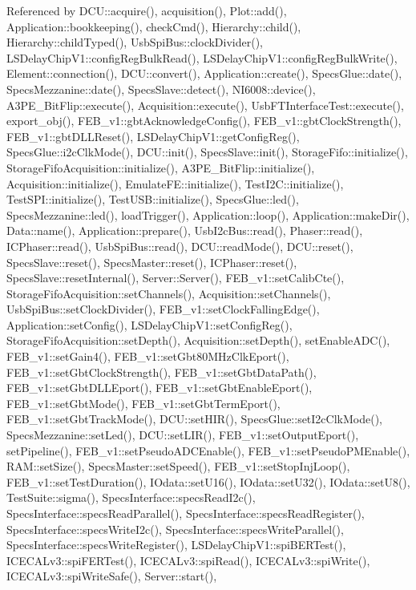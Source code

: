 Referenced by D\+C\+U\+::acquire(), acquisition(), Plot\+::add(), Application\+::bookkeeping(), check\+Cmd(), Hierarchy\+::child(), Hierarchy\+::child\+Typed(), Usb\+Spi\+Bus\+::clock\+Divider(), L\+S\+Delay\+Chip\+V1\+::config\+Reg\+Bulk\+Read(), L\+S\+Delay\+Chip\+V1\+::config\+Reg\+Bulk\+Write(), Element\+::connection(), D\+C\+U\+::convert(), Application\+::create(), Specs\+Glue\+::date(), Specs\+Mezzanine\+::date(), Specs\+Slave\+::detect(), N\+I6008\+::device(), A3\+P\+E\+\_\+\+Bit\+Flip\+::execute(), Acquisition\+::execute(), Usb\+F\+T\+Interface\+Test\+::execute(), export\+\_\+obj(), F\+E\+B\+\_\+v1\+::gbt\+Acknowledge\+Config(), F\+E\+B\+\_\+v1\+::gbt\+Clock\+Strength(), F\+E\+B\+\_\+v1\+::gbt\+D\+L\+L\+Reset(), L\+S\+Delay\+Chip\+V1\+::get\+Config\+Reg(), Specs\+Glue\+::i2c\+Clk\+Mode(), D\+C\+U\+::init(), Specs\+Slave\+::init(), Storage\+Fifo\+::initialize(), Storage\+Fifo\+Acquisition\+::initialize(), A3\+P\+E\+\_\+\+Bit\+Flip\+::initialize(), Acquisition\+::initialize(), Emulate\+F\+E\+::initialize(), Test\+I2\+C\+::initialize(), Test\+S\+P\+I\+::initialize(), Test\+U\+S\+B\+::initialize(), Specs\+Glue\+::led(), Specs\+Mezzanine\+::led(), load\+Trigger(), Application\+::loop(), Application\+::make\+Dir(), Data\+::name(), Application\+::prepare(), Usb\+I2c\+Bus\+::read(), Phaser\+::read(), I\+C\+Phaser\+::read(), Usb\+Spi\+Bus\+::read(), D\+C\+U\+::read\+Mode(), D\+C\+U\+::reset(), Specs\+Slave\+::reset(), Specs\+Master\+::reset(), I\+C\+Phaser\+::reset(), Specs\+Slave\+::reset\+Internal(), Server\+::\+Server(), F\+E\+B\+\_\+v1\+::set\+Calib\+Cte(), Storage\+Fifo\+Acquisition\+::set\+Channels(), Acquisition\+::set\+Channels(), Usb\+Spi\+Bus\+::set\+Clock\+Divider(), F\+E\+B\+\_\+v1\+::set\+Clock\+Falling\+Edge(), Application\+::set\+Config(), L\+S\+Delay\+Chip\+V1\+::set\+Config\+Reg(), Storage\+Fifo\+Acquisition\+::set\+Depth(), Acquisition\+::set\+Depth(), set\+Enable\+A\+D\+C(), F\+E\+B\+\_\+v1\+::set\+Gain4(), F\+E\+B\+\_\+v1\+::set\+Gbt80\+M\+Hz\+Clk\+Eport(), F\+E\+B\+\_\+v1\+::set\+Gbt\+Clock\+Strength(), F\+E\+B\+\_\+v1\+::set\+Gbt\+Data\+Path(), F\+E\+B\+\_\+v1\+::set\+Gbt\+D\+L\+L\+Eport(), F\+E\+B\+\_\+v1\+::set\+Gbt\+Enable\+Eport(), F\+E\+B\+\_\+v1\+::set\+Gbt\+Mode(), F\+E\+B\+\_\+v1\+::set\+Gbt\+Term\+Eport(), F\+E\+B\+\_\+v1\+::set\+Gbt\+Track\+Mode(), D\+C\+U\+::set\+H\+I\+R(), Specs\+Glue\+::set\+I2c\+Clk\+Mode(), Specs\+Mezzanine\+::set\+Led(), D\+C\+U\+::set\+L\+I\+R(), F\+E\+B\+\_\+v1\+::set\+Output\+Eport(), set\+Pipeline(), F\+E\+B\+\_\+v1\+::set\+Pseudo\+A\+D\+C\+Enable(), F\+E\+B\+\_\+v1\+::set\+Pseudo\+P\+M\+Enable(), R\+A\+M\+::set\+Size(), Specs\+Master\+::set\+Speed(), F\+E\+B\+\_\+v1\+::set\+Stop\+Inj\+Loop(), F\+E\+B\+\_\+v1\+::set\+Test\+Duration(), I\+Odata\+::set\+U16(), I\+Odata\+::set\+U32(), I\+Odata\+::set\+U8(), Test\+Suite\+::sigma(), Specs\+Interface\+::specs\+Read\+I2c(), Specs\+Interface\+::specs\+Read\+Parallel(), Specs\+Interface\+::specs\+Read\+Register(), Specs\+Interface\+::specs\+Write\+I2c(), Specs\+Interface\+::specs\+Write\+Parallel(), Specs\+Interface\+::specs\+Write\+Register(), L\+S\+Delay\+Chip\+V1\+::spi\+B\+E\+R\+Test(), I\+C\+E\+C\+A\+Lv3\+::spi\+F\+E\+R\+Test(), I\+C\+E\+C\+A\+Lv3\+::spi\+Read(), I\+C\+E\+C\+A\+Lv3\+::spi\+Write(), I\+C\+E\+C\+A\+Lv3\+::spi\+Write\+Safe(), Server\+::start(), 